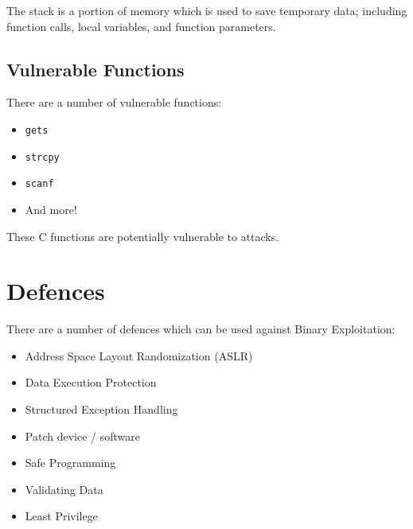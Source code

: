 The stack is a portion of memory which is used to save temporary data; including function calls, local variables, and function parameters. 

\subsection{Vulnerable Functions}
There are a number of vulnerable functions:
\begin{itemize}
    \item \verb|gets|
    \item \verb|strcpy|
    \item \verb|scanf|
    \item And more!
\end{itemize}
These C functions are potentially vulnerable to attacks.

\section{Defences}
There are a number of defences which can be used against Binary Exploitation:
\begin{itemize}
    \item Address Space Layout Randomization (ASLR)
    \item Data Execution Protection
    \item Structured Exception Handling
    \item Patch device / software
    \item Safe Programming
    \item Validating Data
    \item Least Privilege
\end{itemize}
